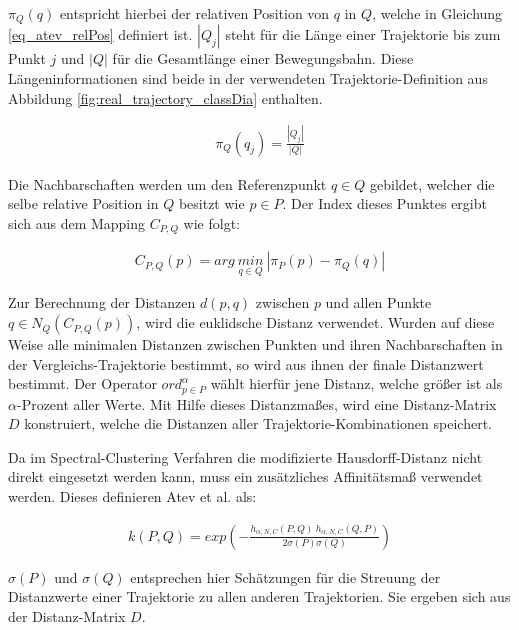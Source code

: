 $\pi_Q(q)$ entspricht hierbei der relativen Position von $q$ in $Q$, welche in Gleichung \ref{eq_atev_relPos} definiert ist.
$|Q_j|$ steht für die Länge einer Trajektorie bis zum Punkt $j$ und $|Q|$ für die Gesamtlänge einer Bewegungsbahn.
Diese Längeninformationen sind beide in der verwendeten Trajektorie-Definition aus Abbildung
\ref{fig:real_trajectory_classDia} enthalten.

\begin{ceqn}
\begin{align}
\label{eq_atev_relPos}
    \pi_Q(q_j) = \frac{|Q_j|}{|Q|}
\end{align}
\end{ceqn}

Die Nachbarschaften werden um den Referenzpunkt $q \in Q$ gebildet, welcher die selbe relative Position
in $Q$ besitzt wie $p \in P$. Der Index dieses Punktes ergibt sich aus dem Mapping $C_{P,Q}$ wie folgt:

\begin{ceqn}
\begin{align}
\label{eq_atev_findPointAtRelPow}
    C_{P,Q}(p) = arg\ \underset{q \in Q}{min}\ |\pi_P(p) - \pi_Q(q)|
\end{align}
\end{ceqn}

Zur Berechnung der Distanzen $d(p,q)$ zwischen $p$ und allen Punkte $q \in N_Q(C_{P,Q}(p))$, wird die euklidsche
Distanz verwendet. Wurden auf diese Weise alle minimalen Distanzen zwischen Punkten und ihren Nachbarschaften in
der Vergleichs-Trajektorie bestimmt, so wird aus ihnen der finale Distanzwert bestimmt. Der Operator
$ord_{p \in P}^{\alpha}$ wählt hierfür jene Distanz, welche größer ist als $\alpha$-Prozent aller Werte.
Mit Hilfe dieses Distanzmaßes, wird eine Distanz-Matrix $D$ konstruiert, welche die Distanzen
aller Trajektorie-Kombinationen speichert.

Da im Spectral-Clustering Verfahren die modifizierte Hausdorff-Distanz nicht direkt eingesetzt werden kann,
muss ein zusätzliches Affinitätsmaß verwendet werden. %
Dieses definieren Atev et al. als:

\begin{ceqn}
\begin{align}
    k(P,Q) = exp (- \frac{h_{\alpha, N, C}(P,Q)\ h_{\alpha, N, C}(Q,P)}{2 \sigma(P) \sigma(Q)})
\end{align}
\end{ceqn}

$\sigma(P)$ und $\sigma(Q)$ entsprechen hier Schätzungen für die Streuung der Distanzwerte einer Trajektorie
zu allen anderen Trajektorien. Sie ergeben sich aus der Distanz-Matrix $D$.

